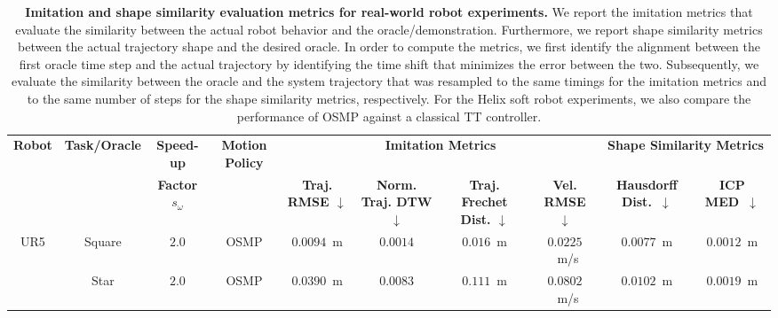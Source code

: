 \begin{table}
    \centering
    \caption{
    \textbf{Imitation and shape similarity evaluation metrics for real-world robot experiments.}
    We report the imitation metrics that evaluate the similarity between the actual robot behavior and the oracle/demonstration. Furthermore, we report shape similarity metrics between the actual trajectory shape and the desired oracle. In order to compute the metrics, we first identify the alignment between the first oracle time step and the actual trajectory by identifying the time shift that minimizes the error between the two. Subsequently, we evaluate the similarity between the oracle and the system trajectory that was resampled to the same timings for the imitation metrics and to the same number of steps for the shape similarity metrics, respectively.
    For the Helix soft robot experiments, we also compare the performance of \gls{OSMP} against a classical \gls{TT} controller.
    }
    \label{tab:osmp:robot_embodiments_quantitative_evaluation} %
    \setlength{\tabcolsep}{1.0pt}   %
    \begin{tiny}
    \begin{tabular}{|c | ccc | cccc | cc |}
        \toprule
        \textbf{Robot} & \textbf{Task/Oracle} & \textbf{Speed-up} & \textbf{Motion Policy} & \multicolumn{4}{c|}{\textbf{Imitation Metrics}} & \multicolumn{2}{c|}{\textbf{Shape Similarity Metrics}}\\
        & & \textbf{Factor $s_\omega$} & & \textbf{Traj. \gls{RMSE} $\downarrow$} & \textbf{Norm. Traj. \gls{DTW} $\downarrow$} & \textbf{Traj. Frechet Dist. $\downarrow$} & \textbf{Vel. \gls{RMSE} $\downarrow$} & \textbf{Hausdorff Dist.~$\downarrow$} & \textbf{\gls{ICP} \gls{MED}~$\downarrow$}\\
        \midrule
        \multirow{6}{*}{UR5} & Square & $2.0$ & \gls{OSMP} & $0.0094$~m & $0.0014$ & $0.016$~m & $0.0225$~m/s & $0.0077$~m & $0.0012$~m \\
        & Star & $2.0$ & \gls{OSMP} & $0.0390$~m & $0.0083$ & $0.111$~m & $0.0802$~m/s & $0.0102$~m & $0.0019$~m \\

\end{tabular}
\end{tiny}
\end{table}
